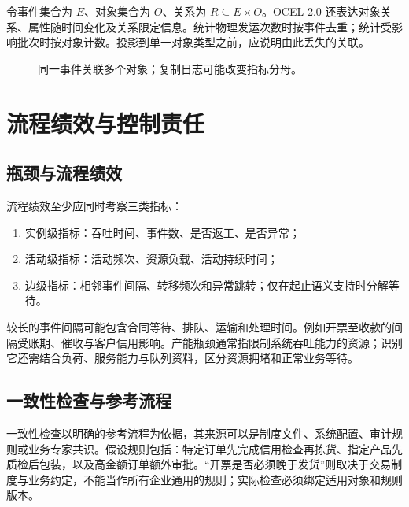 令事件集合为 \(E\)、对象集合为 \(O\)、关系为 \(R\subseteq E\times O\)。OCEL 2.0 还表达对象关系、属性随时间变化及关系限定信息\cite{ocel10}。统计物理发运次数时按事件去重；统计受影响批次时按对象计数。投影到单一对象类型之前，应说明由此丢失的关联。

\begin{figure}[htbp]
\centering
{}
\caption{同一事件关联多个对象；复制日志可能改变指标分母。}
\end{figure}

\section{流程绩效与控制责任}
\subsection{瓶颈与流程绩效}

流程绩效至少应同时考察三类指标：
\begin{enumerate}
  \item 实例级指标：吞吐时间、事件数、是否返工、是否异常；
  \item 活动级指标：活动频次、资源负载、活动持续时间；
  \item 边级指标：相邻事件间隔、转移频次和异常跳转；仅在起止语义支持时分解等待。
\end{enumerate}

较长的事件间隔可能包含合同等待、排队、运输和处理时间。例如开票至收款的间隔受账期、催收与客户信用影响。产能瓶颈通常指限制系统吞吐能力的资源；识别它还需结合负荷、服务能力与队列资料，区分资源拥堵和正常业务等待。

\subsection{一致性检查与参考流程}

一致性检查以明确的参考流程为依据，其来源可以是制度文件、系统配置、审计规则或业务专家共识。假设规则包括：特定订单先完成信用检查再拣货、指定产品先质检后包装，以及高金额订单额外审批。“开票是否必须晚于发货”则取决于交易制度与业务约定，不能当作所有企业通用的规则；实际检查必须绑定适用对象和规则版本。

